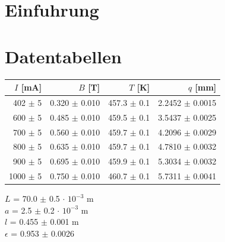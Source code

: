 \documentclass[a4paper,parskip,11pt, DIV12]{scrreprt}
\begin{document}
\fancyfoot{}
\fancyfoot[R]{\small \thepage}
\fancyfoot[L]{}
\fancyfoot[C]{}
\renewcommand{\footrulewidth}{0.4pt} 

\addtolength{\headheight}{2\baselineskip}
\addtolength{\headheight}{0.6pt}


\renewcommand{\headrulewidth}{0.6pt}
\renewcommand{\footrulewidth}{0.4pt}

\renewcommand{\chaptermark}[1]{ \markboth{#1}{} } %



\chapter{Einfuhrung}


\clearpage

\chapter{Datentabellen}

\begin{table}[H]
\centering
\renewcommand{\arraystretch}{1.2} %
\setlength{\tabcolsep}{3mm} %
\begin{tabular}{r|r|r|r}
$I$ [mA] & $B$ [T] & $T$ [K]  & $q$ [mm]\\ \hline
402   $\pm$ 5      & 0.320   $\pm$ 0.010   & 457.3  $\pm$ 0.1   & 2.2452 $\pm$ 0.0015 \\
600    $\pm$ 5      & 0.485   $\pm$ 0.010   & 459.5  $\pm$ 0.1   &3.5437  $\pm$ 0.0025\\
700    $\pm$ 5      & 0.560   $\pm$ 0.010  & 459.7   $\pm$ 0.1   &4.2096  $\pm$ 0.0029\\
800    $\pm$ 5     & 0.635    $\pm$ 0.010 & 459.7    $\pm$ 0.1   & 4.7810 $\pm$  0.0032 \\
900    $\pm$ 5     & 0.695    $\pm$ 0.010 & 459.9    $\pm$ 0.1    &5.3034  $\pm$  0.0032 \\
1000    $\pm$ 5    & 0.750     $\pm$ 0.010 & 460.7       $\pm$ 0.1 &5.7311  $\pm$ 0.0041
\end{tabular}
\end{table} 
$L$ = 70.0 $\pm$ 0.5 $\cdot$ $10^{-3}$ m\\
$a$ = 2.5 $\pm$ 0.2 $\cdot$ $10^{-3}$ m\\
$l$ = 0.455 $\pm$ 0.001 m\\
$\epsilon$ = 0.953 $\pm$ 0.0026\\
\end{document}
